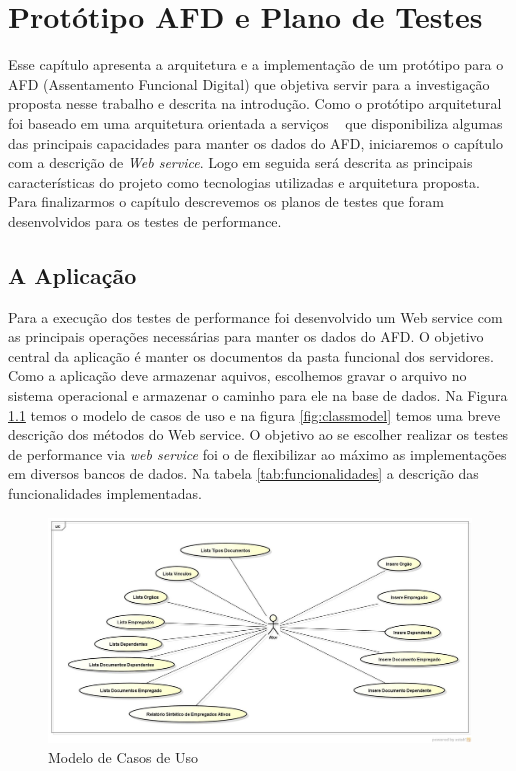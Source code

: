 \chapter{Protótipo AFD e Plano de Testes}

Esse capítulo apresenta a arquitetura e a implementação de um protótipo para o AFD (Assentamento Funcional Digital) que objetiva servir para a investigação proposta nesse trabalho e descrita na introdução. Como o protótipo arquitetural foi baseado em uma arquitetura orientada a serviços ~\cite{erl:2007} que disponibiliza algumas das principais capacidades para manter os dados do AFD, iniciaremos o capítulo com a descrição de \textit{Web service}. Logo em seguida será descrita as principais características do projeto como tecnologias utilizadas e arquitetura proposta. Para finalizarmos o capítulo descrevemos os planos de testes que foram desenvolvidos para os testes de performance.



\section{A Aplicação}

Para a execução dos testes de performance foi desenvolvido um Web service com as principais operações necessárias para manter os dados do AFD. O objetivo central da aplicação é manter os documentos da pasta funcional dos servidores. Como a aplicação deve armazenar aquivos, escolhemos gravar o arquivo no sistema operacional e armazenar o caminho para ele na base de dados. Na Figura \ref{fig:ucmodel} temos o modelo de casos de uso e na figura \ref{fig:classmodel} temos uma breve descrição dos métodos do Web service. O objetivo ao se escolher realizar os testes de performance via \textit{web service} foi o de flexibilizar ao máximo as implementações em diversos bancos de dados. Na tabela \ref{tab:funcionalidades} a descrição das funcionalidades implementadas.

	\begin{figure}[!htbp]
		\begin{center}
			\includegraphics[width=1\textwidth]{diagrama_geral}
		\end{center}
		\caption{Modelo de Casos de Uso}
		\label{fig:ucmodel}
	\end{figure}


